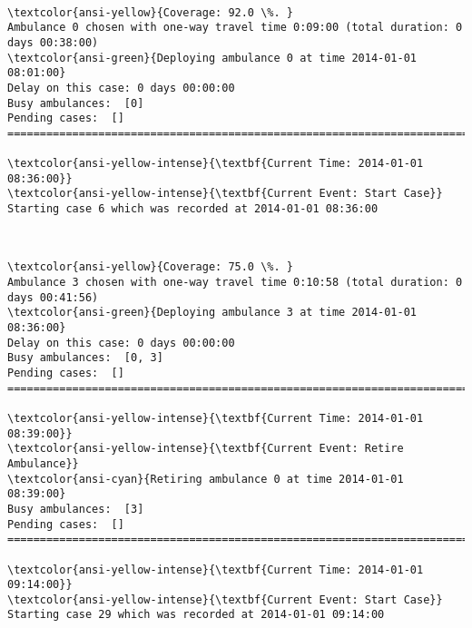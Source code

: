 \documentclass[11pt]{article}
\begin{document}
    \begin{center}
    \end{center}
    { \hspace*{\fill} \\}
    
    \begin{Verbatim}[commandchars=\\\{\}]
\textcolor{ansi-yellow}{Coverage: 92.0 \%. }
Ambulance 0 chosen with one-way travel time 0:09:00 (total duration: 0 days 00:38:00)
\textcolor{ansi-green}{Deploying ambulance 0 at time 2014-01-01 08:01:00}
Delay on this case: 0 days 00:00:00
Busy ambulances:  [0]
Pending cases:  []
========================================================================

\textcolor{ansi-yellow-intense}{\textbf{Current Time: 2014-01-01 08:36:00}}
\textcolor{ansi-yellow-intense}{\textbf{Current Event: Start Case}}
Starting case 6 which was recorded at 2014-01-01 08:36:00

    \end{Verbatim}

    \begin{center}
    \end{center}
    { \hspace*{\fill} \\}
    
    \begin{Verbatim}[commandchars=\\\{\}]
\textcolor{ansi-yellow}{Coverage: 75.0 \%. }
Ambulance 3 chosen with one-way travel time 0:10:58 (total duration: 0 days 00:41:56)
\textcolor{ansi-green}{Deploying ambulance 3 at time 2014-01-01 08:36:00}
Delay on this case: 0 days 00:00:00
Busy ambulances:  [0, 3]
Pending cases:  []
========================================================================

\textcolor{ansi-yellow-intense}{\textbf{Current Time: 2014-01-01 08:39:00}}
\textcolor{ansi-yellow-intense}{\textbf{Current Event: Retire Ambulance}}
\textcolor{ansi-cyan}{Retiring ambulance 0 at time 2014-01-01 08:39:00}
Busy ambulances:  [3]
Pending cases:  []
========================================================================

\textcolor{ansi-yellow-intense}{\textbf{Current Time: 2014-01-01 09:14:00}}
\textcolor{ansi-yellow-intense}{\textbf{Current Event: Start Case}}
Starting case 29 which was recorded at 2014-01-01 09:14:00

    \end{Verbatim}
\end{document}
